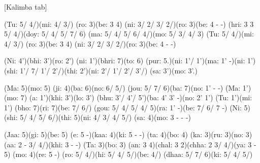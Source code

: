 \documentclass[11pt]{article}
\begin{document}
[Kalimba tab]
\begin{jianpu}
(Tu: 5/ 4/)(mi: 4/ 3/) (ro: 3)(be: 3 4) (ni: 3/ 2/ 3/ 2/)(ro: 3)(be: 4 - -)
(hri: 3 3 5/ 4/)(doy: 5/ 4/ 5/ 7/ 6) (ma: 5/ 4/ 5/ 6/ 4/)(mo: 5/ 3/ 4/ 3)
(Tu: 5/ 4/)(mi: 4/ 3/) (ro: 3)(be: 3 4) (ni: 3/ 2/ 3/ 2/)(ro: 3)(be: 4 - -)

(Ni: 4')(bhi: 3')(ro: 2') (ni: 1')(bhri: 7)(to: 6)
(pur: 5.)(ni: 1'/ 1')(ma: 1' -)(ni: 1')(shi: 1'/ 7/ 1'/ 2'/)(thi: 2')(ni: 2'/ 1'/ 2'/ 3'/) (sa: 3')(mo: 3'.)

(Ma: 5)(mo: 5) (ji: 4)(ba: 6)(no: 6/ 5/) (jou: 5/ 7/ 6)(ba: 7)(no: 1' - -)
(Ma: 1')(mo: 7) (a: 1')(khi: 3')(lo: 3') (bhu: 3'/ 4'/ 5')(ba: 4' 3' -)(no: 2' 1')
(Tu: 1')(mi: 1') (bho: 7)(ri: 7)(be: 7/ 6/) (gou: 5/ 4/ 5/ 4/ 5)(ra: 1' -)(be: 7/ 6/ 7 -)
(Ni: 5)(shi: 5/ 4/ 5/ 6/)(thi: 5)(ni: 4/ 3/ 4/ 5/) (sa: 4)(mo: 3 - - -)

(Jaa: 5)(gi: 5)(be: 5) (e: 5 -)(kaa: 4)(ki: 5 - -)
(ta: 4)(bo: 4) (ka: 3)(ru: 3)(no: 3) (aa: 2 - 3/ 4/)(khi: 3 - -)
(Ta: 3)(bo: 3) (an: 3 4)(chal: 3 2)(chha: 2 3/ 4/)(ya: 3 - 5) (mo: 4)(re: 5 -)
(ro: 5/ 4/)(hi: 5/ 4/ 5/)(be: 4/) (dhaa: 5/ 7/ 6)(ki: 5/ 4/ 5/)
\end{jianpu}
\end{document}
